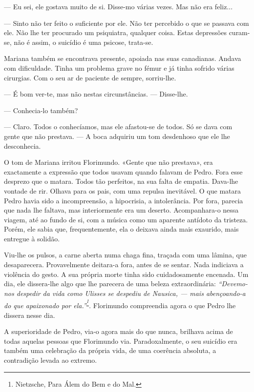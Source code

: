 --- Eu sei, ele gostava muito de si. Disse-mo várias vezes. Mas não era
feliz...

--- Sinto não ter feito o suficiente por ele. Não ter percebido o que se
passava com ele. Não lhe ter procurado um psiquiatra, qualquer coisa.
Estas depressões curam-se, não é assim, o suicídio é uma psicose,
trata-se.

Mariana também se encontrava presente, apoiada nas suas canadianas.
Andava com dificuldade. Tinha um problema grave no fémur e já tinha
sofrido várias cirurgias. Com o seu ar de paciente de sempre,
sorriu-lhe.

--- É bom ver-te, mas não nestas circunstâncias. --- Disse-lhe.

--- Conhecia-lo também?

--- Claro. Todos o conhecíamos, mas ele afastou-se de todos. Só se dava
com gente que não prestava. --- A boca adquiriu um tom desdenhoso que ele
lhe desconhecia.

O tom de Mariana irritou Florimundo. «Gente que não prestava», era
exactamente a expressão que todos usavam quando falavam de Pedro. Fora
esse desprezo que o matara. Todos tão perfeitos, na sua falta de
empatia. Dava-lhe vontade de rir. Olhava para os pais, com uma repulsa
inevitável. O que matara Pedro havia sido a incompreensão, a hipocrisia,
a intolerância. Por fora, parecia que nada lhe faltava, mas
interiormente era um deserto. Acompanhara-o nessa viagem, até ao fundo
de si, com a música como um aparente antídoto da tristeza. Porém, ele
sabia que, frequentemente, ela o deixava ainda mais exaurido, mais
entregue à solidão.

Viu-lhe os pulsos, a carne aberta numa chaga fina, traçada com uma
lâmina, que desaparecera. Provavelmente deitara-a fora, antes de se
sentar. Nada indiciava a violência do gesto. A sua própria morte tinha
sido cuidadosamente encenada. Um dia, ele dissera-lhe algo que lhe
parecera de uma beleza extraordinária: \emph{``Devemo-nos despedir da
vida como Ulisses se despediu de Nausica, --- mais abençoando-a do que
apaixonado por ela.''}\textsuperscript{\emph{\footnote{Nietzsche, Para
  Álem do Bem e do Mal.}}}\emph{. }Florimundo compreendia agora o que
Pedro lhe dissera nesse dia.

A superioridade de Pedro, via-o agora mais do que nunca, brilhava acima
de todas aquelas pessoas que Florimundo via. Paradoxalmente, o seu
suicídio era também uma celebração da própria vida, de uma coerência
absoluta, a contradição levada ao extremo.

